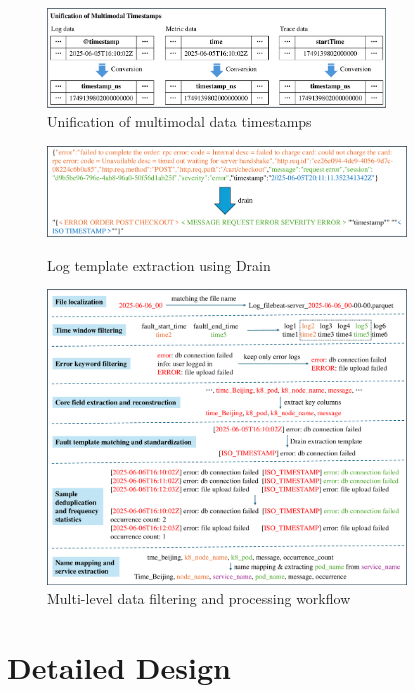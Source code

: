 \documentclass[10pt]{article}
\begin{document}
\begin{figure}[ht]
    \centering
    \includegraphics[width=0.8\textwidth]{pics/fig4.pdf}
    \caption{Unification of multimodal data timestamps}
    \label{fig4}
\end{figure}

\begin{figure}[!t]
    \centering
    \includegraphics[width=0.85\textwidth]{pics/fig5.pdf}
    \caption{Log template extraction using Drain}
    \label{fig5}

    \vspace{10pt}
    \includegraphics[width=0.85\textwidth]{pics/fig6.pdf}
    \caption{Multi-level data filtering and processing workflow}
    \label{fig6}
\end{figure}


\section{Detailed Design}
\label{sec:detail}
\end{document}
